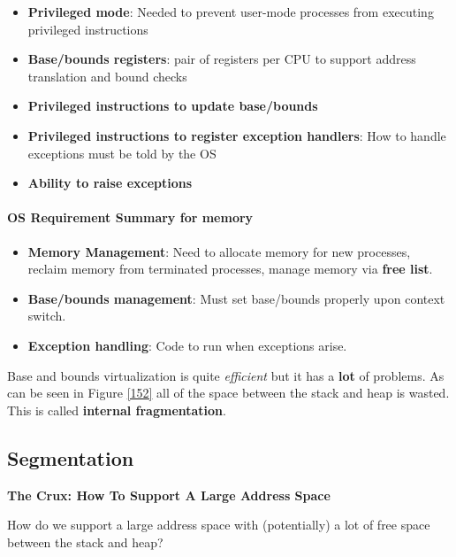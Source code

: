 \begin{itemize}
    \item \textbf{Privileged mode}: Needed to prevent user-mode processes 
        from executing privileged instructions
    \item \textbf{Base/bounds registers}: pair of registers per CPU to support
        address translation and bound checks
    \item \textbf{Privileged instructions to update base/bounds}
    \item \textbf{Privileged instructions to register exception handlers}: How
        to handle exceptions must be told by the OS
    \item \textbf{Ability to raise exceptions}
\end{itemize}

\paragraph{OS Requirement Summary for memory}

\begin{itemize}
    \item \textbf{Memory Management}: Need to allocate memory for new processes,
        reclaim memory from terminated processes, manage memory via \textbf{free
        list}.
    \item \textbf{Base/bounds management}: Must set base/bounds properly
        upon context switch.
    \item \textbf{Exception handling}: Code to run when exceptions arise.
\end{itemize}

Base and bounds virtualization is quite \textit{efficient} but it has a
\textbf{lot} of problems. As can be seen in Figure \ref{152} all of the space
between the stack and heap is wasted. This is called
\textbf{internal fragmentation}.

\subsection{Segmentation}

\begin{tcolorbox}
    \begin{center}
        \textbf{The Crux: How To Support A Large Address Space}
    \end{center}

    How do we support a large address space with (potentially) a lot of free 
    space between the stack and heap?
\end{tcolorbox}

